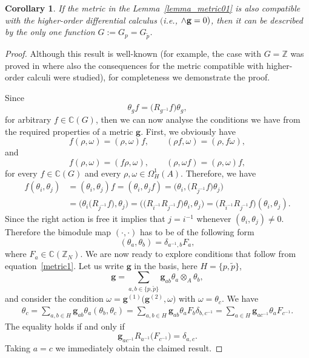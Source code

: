 \documentclass[10pt,a4paper]{amsart}
\numberwithin{equation}{section}
\newtheorem{Corollary}[Theorem]{Corollary}
\newcommand{\Z}{\mathbb{Z}}
\newcommand{\C}{\mathbb{C}}
\newcommand{\ip}{{\tilde{p}}}
\begin{document}
\begin{Corollary}\label{cor_metric}
If the metric in the Lemma~{\rm \ref{lemma_metric01}} is also compatible with the higher-order dif\-fe\-rential calculus $($i.e., $\wedge{\bf g}=0)$, then it can be described by the only one function $G:=G_p=G_\ip$.
\end{Corollary}

\begin{proof}Although this result is well-known (for example, the case with $G=\mathbb{Z}$ was proved in \cite{M2} where also the
consequences for the metric compatible with higher-order calculi were studied), for completeness we demonstrate the proof.

Since
\begin{equation*}
\theta_g f=\big(R_{g^{-1}} f\big) \theta_g,
\end{equation*}
for arbitrary $f \in \C(G)$, then we can now analyse the conditions we have from the required properties
of a metric $\mathbf{g}$. First, we obviously have
\[ f(\rho,\omega)=(\rho,\omega)f, \qquad (\rho f,\omega)=(\rho,f\omega),\]
and
\[ f(\rho,\omega)=(f\rho,\omega), \qquad (\rho,\omega f)=(\rho,\omega)f, \]
for every $f\in\C(G)$ and every $\rho,\omega\in \Omega^1_H(A)$. Therefore, we have
\begin{align*}
f(\theta_i,\theta_j)&=(\theta_i,\theta_j)f=(\theta_i,\theta_j f)=\big(\theta_i,\big(R_{j^{-1}}f\big)\theta_j\big) \\
&=\big(\theta_i\big(R_{j^{-1}}f\big),\theta_j\big)
=\big(\big(R_{i^{-1}}R_{j^{-1}}f\big) \theta_i,\theta_j\big) = \big(R_{i^{-1}}R_{j^{-1}}f\big)(\theta_i,\theta_j).
\end{align*}
Since the right action is free it implies that $j=i^{-1}$ whenever $(\theta_i,\theta_j)\neq0$. Therefore
the bimodule map $(\cdot, \cdot)$ has to be of the following form
\begin{equation*}
(\theta_a,\theta_b)=\delta_{a^{-1},b} F_{a},
\end{equation*}
where $F_a \in \C(\Z_N)$.
We are now ready to explore conditions that follow from equation~\eqref{metric1}. Let us write $\mathbf{g}$ in the basis, here $H=\{p,\ip\}$,
\begin{equation*}
\mathbf{g} = \sum\limits_{a,b \in \{p,\ip\}} \mathbf{g}_{ab} \theta_a \otimes_A \theta_b,
\end{equation*}
and consider the condition $\omega=\mathbf{g}^{(1)}\big(\mathbf{g}^{(2)},\omega\big)$ with
$\omega = \theta_c$. We have
\begin{gather*}
\theta_c
=\sum\limits_{a,b \in H} \mathbf{g}_{ab} \theta_a (\theta_b, \theta_c)=
\sum\limits_{a,b \in H} \mathbf{g}_{ab} \theta_a F_b \delta_{b,c^{-1}}
=\sum\limits_{a \in H} \mathbf{g}_{ac^{-1}} \theta_a F_{c^{-1}}.
\end{gather*}
The equality holds if and only if
\begin{equation*}
\mathbf{g}_{ac^{-1}} R_{a^{-1}}\big(F_{c^{-1}}\big) = \delta_{a,c}.
\end{equation*}
Taking $a=c$ we immediately obtain the claimed result.
\end{proof}
\end{document}
